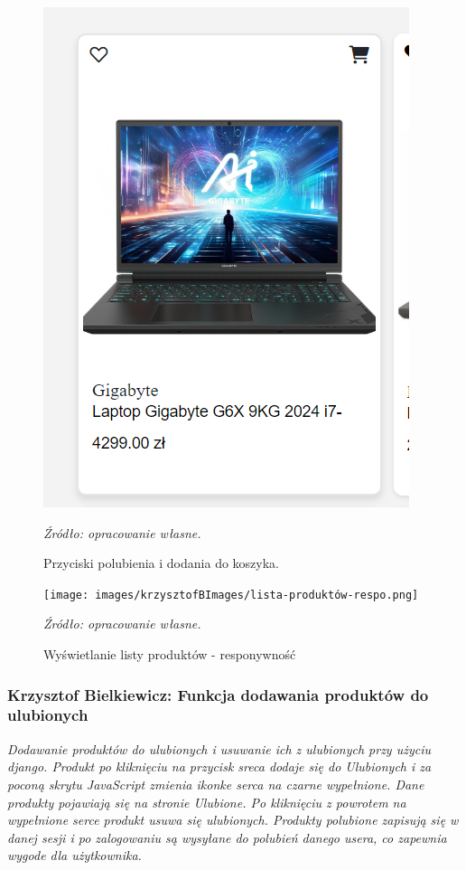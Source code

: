 \documentclass[12pt,a4paper,oneside]{article}
\theoremstyle{definition}
\numberwithin{equation}{section}
\begin{document}
\begin{figure}[H]
    \centering
    \includegraphics[width=0.5\columnwidth]{images/krzysztofBImages/przyciski-polubienia-koszyka.png}
    \caption{Przyciski polubienia i dodania do koszyka.}
    \emph{Źródło: opracowanie własne.}
\end{figure}

\begin{figure}[H]
    \centering
    \texttt{[image: images/krzysztofBImages/lista-produktów-respo.png]}
    \caption{Wyświetlanie listy produktów - responywność}
    \emph{Źródło: opracowanie własne.}
\end{figure}



\subsubsection{Krzysztof Bielkiewicz: Funkcja dodawania produktów do ulubionych}
\label{1.3.14}
\textit{Dodawanie produktów do ulubionych i usuwanie ich z ulubionych przy użyciu django.
Produkt po kliknięciu na przycisk sreca dodaje się do Ulubionych i za poconą skrytu 
JavaScript zmienia ikonke serca na czarne wypełnione. Dane produkty pojawiają się na stronie Ulubione.
Po kliknięciu z powrotem na wypełnione serce produkt usuwa się ulubionych.
Produkty polubione zapisują się w danej sesji i po zalogowaniu są wysyłane do polubień danego usera,
co zapewnia wygode dla użytkownika.}
\end{document}
